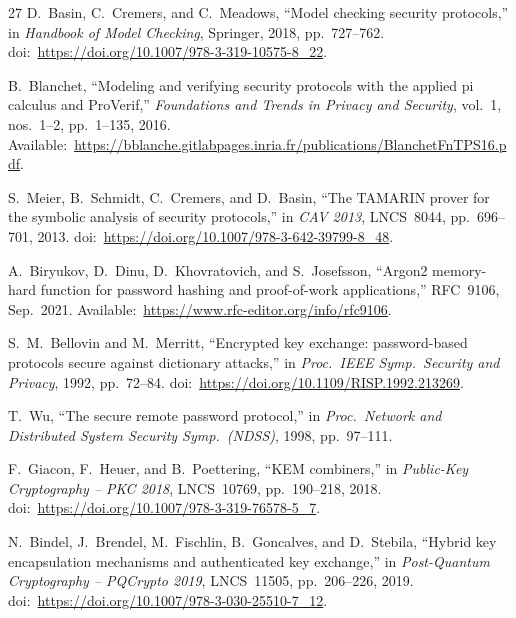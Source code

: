 \documentclass[conference]{IEEEtran}
\begin{document}
\begin{thebibliography}{27}
D.~Basin, C.~Cremers, and C.~Meadows, ``Model checking security protocols,'' in \emph{Handbook of Model Checking}, Springer, 2018, pp.~727--762. doi:~\url{https://doi.org/10.1007/978-3-319-10575-8_22}.

B.~Blanchet, ``Modeling and verifying security protocols with the applied pi calculus and ProVerif,'' \emph{Foundations and Trends in Privacy and Security}, vol.~1, nos.~1--2, pp.~1--135, 2016. Available:~\url{https://bblanche.gitlabpages.inria.fr/publications/BlanchetFnTPS16.pdf}.

S.~Meier, B.~Schmidt, C.~Cremers, and D.~Basin, ``The TAMARIN prover for the symbolic analysis of security protocols,'' in \emph{CAV 2013}, LNCS~8044, pp.~696--701, 2013. doi:~\url{https://doi.org/10.1007/978-3-642-39799-8_48}.

A.~Biryukov, D.~Dinu, D.~Khovratovich, and S.~Josefsson, ``Argon2 memory-hard function for password hashing and proof-of-work applications,'' RFC~9106, Sep.~2021. Available:~\url{https://www.rfc-editor.org/info/rfc9106}.

S.~M.~Bellovin and M.~Merritt, ``Encrypted key exchange: password-based protocols secure against dictionary attacks,'' in \emph{Proc.\ IEEE Symp.\ Security and Privacy}, 1992, pp.~72--84. doi:~\url{https://doi.org/10.1109/RISP.1992.213269}.

T.~Wu, ``The secure remote password protocol,'' in \emph{Proc.\ Network and Distributed System Security Symp.\ (NDSS)}, 1998, pp.~97--111.

F.~Giacon, F.~Heuer, and B.~Poettering, ``KEM combiners,'' in \emph{Public-Key Cryptography -- PKC 2018}, LNCS~10769, pp.~190--218, 2018. doi:~\url{https://doi.org/10.1007/978-3-319-76578-5_7}.

N.~Bindel, J.~Brendel, M.~Fischlin, B.~Goncalves, and D.~Stebila, ``Hybrid key encapsulation mechanisms and authenticated key exchange,'' in \emph{Post-Quantum Cryptography -- PQCrypto 2019}, LNCS~11505, pp.~206--226, 2019. doi:~\url{https://doi.org/10.1007/978-3-030-25510-7_12}.

\end{thebibliography}
\end{document}
